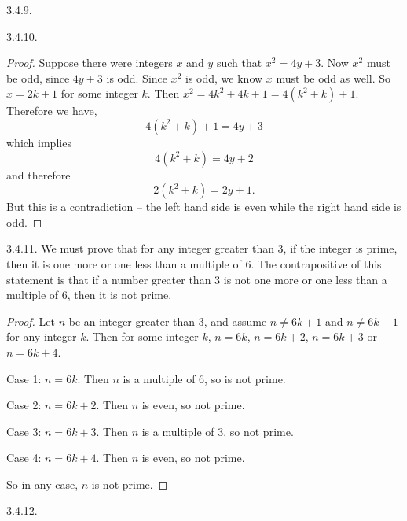 \begin {itemize}
\begin{ans}{3.4.9.}
\end{ans}
\begin{ans}{3.4.10.}
		\begin{proof}
		  Suppose there were integers $x$ and $y$ such that $x^2 = 4y + 3$.  Now $x^2$ must be odd, since $4y + 3$ is odd.  Since $x^2$ is odd, we know $x$ must be odd as well.  So $x = 2k + 1$ for some integer $k$.  Then $x^2 = 4k^2 + 4k + 1 = 4(k^2 + k) + 1$.  Therefore we have,
		  \[4(k^2 + k) + 1 = 4y + 3\]
		  which implies
		  \[4(k^2 + k) = 4y + 2\]
		  and therefore
		  \[2(k^2 + k) = 2y + 1.\]
		  But this is a contradiction -- the left hand side is even while the right hand side is odd.
		\end{proof}

	
\end{ans}
\begin{ans}{3.4.11.}
		We must prove that for any integer greater than 3, if the integer is prime, then it is one more or one less than a multiple of 6.  The contrapositive of this statement is that if a number greater than 3 is not one more or one less than a multiple of 6, then it is not prime.
		\begin{proof}
		      Let $n$ be an integer greater than 3, and assume $n \ne 6k+1$ and $n \ne 6k-1$ for any integer $k$.  Then for some integer $k$, $n = 6k$, $n = 6k+2$, $n = 6k+3$ or $n = 6k+4$.

		      Case 1: $n = 6k$.  Then $n$ is a multiple of 6, so is not prime.

		      Case 2: $n = 6k+2$.  Then $n$ is even, so not prime.

		      Case 3: $n = 6k+3$.  Then $n$ is a multiple of 3, so not prime.

		      Case 4: $n = 6k+4$.  Then $n$ is even, so not prime.

		      So in any case, $n$ is not prime.
		    \end{proof}
	
\end{ans}
\begin{ans}{3.4.12.}
\end{ans}
\end{itemize}
